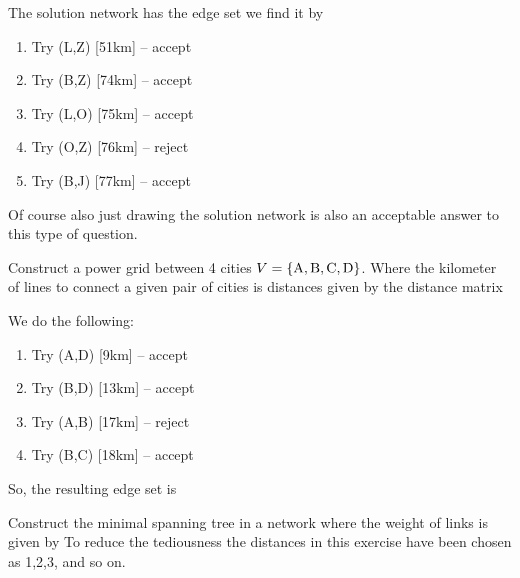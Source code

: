 
\solution
The solution network has the edge set 
we find it by
\begin{enumerate}
    \item Try (L,Z) [51km] -- accept
    \item Try (B,Z) [74km] -- accept
    \item Try (L,O) [75km] -- accept
    \item Try (O,Z) [76km] -- reject
    \item Try (B,J) [77km] -- accept 
\end{enumerate}
Of course also just drawing the solution network is also an acceptable answer to this type of question.



Construct a power grid between 4 cities $V=\{ {\rm A},{\rm B},{\rm C},{\rm D}\}$. Where the kilometer of lines to connect a given pair of cities is distances given by the distance matrix
  

\solution
We do the following:
\begin{enumerate}
\item Try (A,D) [9km] -- accept
\item Try (B,D) [13km] -- accept
\item Try (A,B) [17km] -- reject
\item Try (B,C) [18km] -- accept  
\end{enumerate}
So, the resulting edge set is 



Construct the minimal spanning tree in a network where the weight of links is given by
To reduce the tediousness the distances in this exercise have been chosen as 1,2,3, and so on. 

